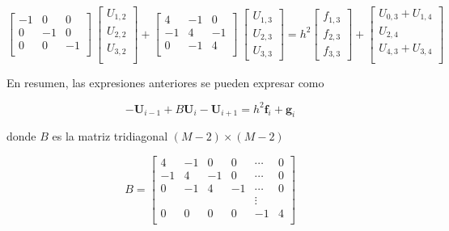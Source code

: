 \documentclass[12pt]{article}
\begin{document}
\begin{equation*}
\begin{bmatrix}
-1 & 0 & 0 \\
0 & -1 & 0 \\
0 & 0 & -1 \\
\end{bmatrix} \
\begin{bmatrix}
U_{1,2} \\ U_{2,2} \\ U_{3,2} \\
\end{bmatrix} +
\begin{bmatrix}
4 & -1 & 0 \\
-1 & 4 & -1 \\
0 & -1 & 4 \\ 
\end{bmatrix} \ 
\begin{bmatrix}
U_{1,3} \\ U_{2,3} \\ U_{3,3} 
\end{bmatrix} = h^2
\begin{bmatrix}
f_{1,3} \\ f_{2,3} \\ f_{3,3}
\end{bmatrix} +
\begin{bmatrix}
U_{0,3} + U_{1,4}\\  U_{2,4} \\ U_{4,3} + U_{3,4} \\
\end{bmatrix}
\end{equation*}

En resumen, las expresiones anteriores se pueden expresar como 

\begin{equation*}
- \mathbf{U}_{i-1} + B\mathbf{U}_{i} - \mathbf{U}_{i+1} = h^2 \mathbf{f}_i + \mathbf{g}_i 
\end{equation*}

donde $B$ es la matriz tridiagonal $(M-2) \times (M-2)$

\begin{equation*}
B = \begin{bmatrix}
4 & -1 & 0 & 0 & \cdots & 0 \\
-1 & 4 & -1 & 0 & \cdots & 0 \\
0 & -1 & 4  & -1 & \cdots & 0 \\
 &     &    &     & \vdots &   \\
0 &  0  &  0 & 0 & -1 & 4 \\   
\end{bmatrix}
\end{equation*}
\end{document}
